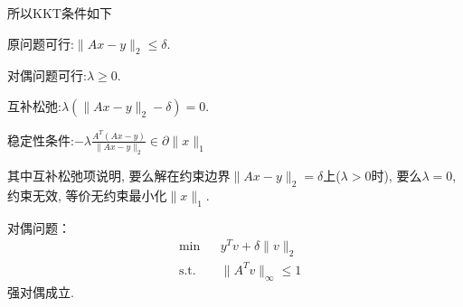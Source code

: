 \documentclass[UTF8]{ctexart}
\theoremstyle{definition}
\theoremstyle{examplestyle}
\theoremstyle{remark}
\begin{document}
所以KKT条件如下

原问题可行:$\|Ax-y\|_2\le\delta$.

对偶问题可行:$\lambda\ge0$.

互补松弛:$\lambda(\|Ax-y\|_2-\delta)=0$.

稳定性条件:$-\lambda\frac{A^T(Ax-y)}{\|Ax-y\|_2}\in\partial\|x\|_1$

其中互补松弛项说明, 要么解在约束边界$\|Ax-y\|_2=\delta$上($\lambda>0$时), 要么$\lambda=0$, 约束无效, 等价无约束最小化$\|x\|_1$.

对偶问题：
\[\begin{aligned}
    &\text{min} &&y^Tv+\delta\|v\|_2\\
    &\text{s.t.} &&\|A^Tv\|_\infty\le1
\end{aligned}\]
强对偶成立.
\end{document}
